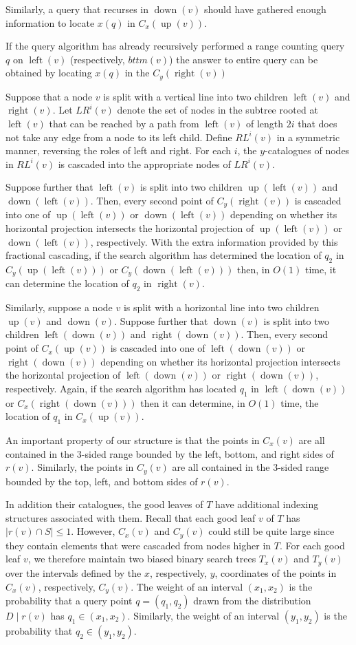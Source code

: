 \documentclass[lotsofwhite,charterfonts]{patmorin}
\DeclareMathOperator{\lft}{left}
\DeclareMathOperator{\rght}{right}
\DeclareMathOperator{\tp}{up}
\DeclareMathOperator{\bttm}{down}
\begin{document}
Similarly, a query
that recurses in $\bttm(v)$ should have gathered enough information
to locate $x(q)$ in $C_x(\tp(v))$.


If the query algorithm
has already recursively performed a range counting query $q$ on $\lft(v)$
(respectively, $bttm(v)$) the answer to entire query can be obtained
by locating $x(q)$ in the $C_y(\rght(v))$

Suppose that a node $v$ is split with a vertical line into two
children $\lft(v)$ and $\rght(v)$.  Let $LR^i(v)$ denote the set of
nodes in the subtree rooted at $\lft(v)$ that can be reached by a path
from $\lft(v)$ of length $2i$ that does not take any edge from a node
to its left child.  Define $RL^i(v)$ in a symmetric manner, reversing
the roles of left and right. For each $i$, the $y$-catalogues of nodes
in $RL^i(v)$ is cascaded into the appropriate nodes of 
$LR^i(v)$. 

  Suppose
further that $\lft(v)$ is split into two children $\tp(\lft(v))$ and
$\bttm(\lft(v))$.  Then, every second point of $C_y(\rght(v))$ is
cascaded into one of $\tp(\lft(v))$ or $\bttm(\lft(v))$ depending on
whether its horizontal projection intersects the horizontal projection
of $\tp(\lft(v))$ or $\bttm(\lft(v))$, respectively.  With the extra
information provided by this fractional cascading, if the search
algorithm has determined the location of $q_2$ in $C_y(\tp(\lft(v)))$
or $C_y(\bttm(\lft(v)))$ then, in $O(1)$ time, it can determine the
location of $q_2$ in $\rght(v)$.

Similarly, suppose a node $v$ is split with a horizontal line into two
children $\tp(v)$ and $\bttm(v)$.  Suppose further that $\bttm(v)$ is
split into two children $\lft(\bttm(v))$ and $\rght(\bttm(v))$.  Then,
every second point of $C_x(\tp(v))$ is cascaded into one of
$\lft(\bttm(v))$ or $\rght(\bttm(v))$ depending on whether its
horizontal projection intersects the horizontal projection of
$\lft(\bttm(v))$ or $\rght(\bttm(v))$, respectively.  Again, if the
search algorithm has located $q_1$ in $\lft(\bttm(v))$ or
$C_x(\rght(\bttm(v)))$ then it can determine, in $O(1)$ time, the location
of $q_1$ in $C_x(\tp(v))$.

An important property of our structure is that the points in $C_x(v)$
are all contained in the 3-sided range bounded by the left, bottom,
and right sides of $r(v)$.  Similarly, the points in $C_y(v)$ are all
contained in the 3-sided range bounded by the top, left, and bottom
sides of $r(v)$.

In addition their catalogues, the good leaves of $T$ have additional
indexing structures associated with them.  Recall that each good leaf
$v$ of $T$ has $|r(v)\cap S| \le 1$. However, $C_x(v)$ and $C_y(v)$
could still be quite large since they contain elements that were
cascaded from nodes higher in $T$.  For each good leaf $v$, we
therefore maintain two biased binary search trees $T_x(v)$ and
$T_y(v)$ over the intervals defined by the $x$, respectively, $y$,
coordinates of the points in $C_x(v)$, respectively, $C_y(v)$.  The
weight of an interval $(x_1,x_2)$ is the probability that a query
point $q=(q_1,q_2)$ drawn from the distribution $D\mid r(v)$ has
$q_1\in(x_1,x_2)$.   Similarly, the weight of an interval $(y_1,y_2)$
is the probability that $q_2\in (y_1,y_2)$.
\end{document}
